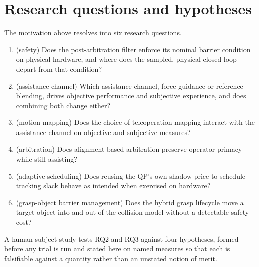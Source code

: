 \section{Research questions and hypotheses}
\label{sec:rqs}

The motivation above resolves into six research questions.

\begin{enumerate}[nosep, label=\textbf{RQ\arabic*.}]
\item (safety) Does the post-arbitration filter enforce its nominal barrier condition on physical hardware, and where does the sampled, physical closed loop depart from that condition?
\item (assistance channel) Which assistance channel, force guidance or reference blending, drives objective performance and subjective experience, and does combining both change either?
\item (motion mapping) Does the choice of teleoperation mapping interact with the assistance channel on objective and subjective measures?
\item (arbitration) Does alignment-based arbitration preserve operator primacy while still assisting?
\item (adaptive scheduling) Does reusing the QP's own shadow price to schedule tracking slack behave as intended when exercised on hardware?
\item (grasp-object barrier management) Does the hybrid grasp lifecycle move a target object into and out of the collision model without a detectable safety cost?
\end{enumerate}

A human-subject study tests RQ2 and RQ3 against four hypotheses, formed before any trial is run and stated here on named measures so that each is falsifiable against a quantity rather than an unstated notion of merit.

